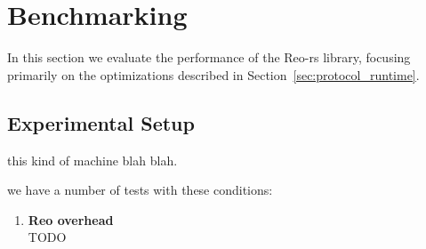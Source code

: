 \chapter{Benchmarking}
\label{sec:benchmarking}

In this section we evaluate the performance of the Reo-rs library, focusing primarily on the optimizations described in Section~\ref{sec:protocol_runtime}.

\section{Experimental Setup}

this kind of machine blah blah.

we have a number of tests with these conditions:

\begin{enumerate}
	\item \textbf{Reo overhead}\\
	TODO
	
\end{enumerate}



